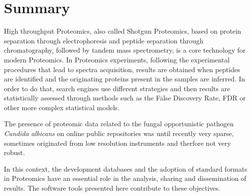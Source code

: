 %
%
%
%
%

\chapter{Summary}




High throughput Proteomics, also called Shotgun Proteomics,
based on protein separation through 
electrophoresis and peptide separation through chromatography, followed
by tandem mass spectrometry, is a core technology for modern Proteomics.
In Proteomics experiments, following the experimental procedures that
lead to spectra acquisition, results are obtained when peptides are 
identified and the originating proteins present in the samples are inferred.
In order to do that, search engines use different strategies and then
results are statistically assessed through methods such as the False
Discovery Rate, FDR or other more complex statistical models.

The presence of proteomic data related to the fungal opportunistic 
pathogen \textit{Candida albicans} on online public repositories was
until recently very sparse, sometimes originated from low resolution
instruments and therfore not very robust.

In this context, the development databases and the adoption
of standard formats in Proteomics have an essential role in the analysis,
sharing and dissemination of results. The software tools presented here 
contribute to these objectives.

